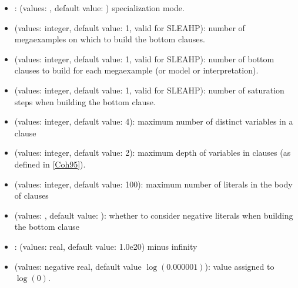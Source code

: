 \documentclass[letterpaper,10pt,english]{sphinxmanual}
\begin{document}
\begin{itemize}
\begin{itemize}
\item {} 
\sphinxAtStartPar
{}: (values: , default value: ) specialization mode.

\item {} 
\sphinxAtStartPar
{} (values: integer, default value: 1, valid for SLEAHP): number of mega\sphinxhyphen{}examples on which to build the bottom clauses.

\item {} 
\sphinxAtStartPar
{} (values: integer, default value: 1, valid for SLEAHP): number of bottom clauses to build for each mega\sphinxhyphen{}example (or model or interpretation).

\item {} 
\sphinxAtStartPar
{} (values: integer, default value: 1, valid for SLEAHP): number of saturation steps when building the bottom clause.

\item {} 
\sphinxAtStartPar
{} (values: integer, default value: 4): maximum number of distinct variables in a clause

\item {} 
\sphinxAtStartPar
{} (values: integer, default value: 2): maximum depth of variables in clauses (as defined in {[}\hyperlink{cite.index:id22}{Coh95}{]}).

\item {} 
\sphinxAtStartPar
{} (values: integer, default value: 100): maximum number of literals in the body of clauses

\item {} 
\sphinxAtStartPar
{} (values: , default value: ): whether to consider negative literals when building the bottom clause

\item {} 
\sphinxAtStartPar
{}: (values: real, default value: \sphinxhyphen{}1.0e20) minus infinity

\item {} 
\sphinxAtStartPar
{} (values: negative real, default value \(\log(0.000001)\)): value assigned to \(\log(0)\).


\end{itemize}
\end{itemize}
\end{document}
